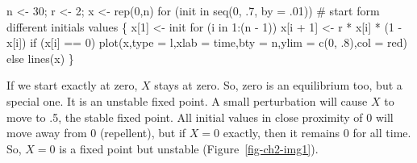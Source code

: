 \documentclass[
  a4paper,
  DIV=11,
  numbers=noendperiod,
  oneside]{scrreprt}
\newenvironment{Shaded}{\begin{snugshade}}{\end{snugshade}}
\newcommand{\AttributeTok}[1]{\textcolor[rgb]{0.40,0.45,0.13}{#1}}
\newcommand{\CommentTok}[1]{\textcolor[rgb]{0.37,0.37,0.37}{#1}}
\newcommand{\ControlFlowTok}[1]{\textcolor[rgb]{0.00,0.23,0.31}{#1}}
\newcommand{\DecValTok}[1]{\textcolor[rgb]{0.68,0.00,0.00}{#1}}
\newcommand{\FunctionTok}[1]{\textcolor[rgb]{0.28,0.35,0.67}{#1}}
\newcommand{\NormalTok}[1]{\textcolor[rgb]{0.00,0.23,0.31}{#1}}
\newcommand{\OtherTok}[1]{\textcolor[rgb]{0.00,0.23,0.31}{#1}}
\newcommand{\SpecialCharTok}[1]{\textcolor[rgb]{0.37,0.37,0.37}{#1}}
\newcommand{\StringTok}[1]{\textcolor[rgb]{0.13,0.47,0.30}{#1}}
\begin{document}
\begin{Shaded}
\begin{Highlighting}[]
\NormalTok{n }\OtherTok{\textless{}{-}} \DecValTok{30}\NormalTok{; r }\OtherTok{\textless{}{-}} \DecValTok{2}\NormalTok{; x }\OtherTok{\textless{}{-}} \FunctionTok{rep}\NormalTok{(}\DecValTok{0}\NormalTok{,n)}
\ControlFlowTok{for}\NormalTok{ (init }\ControlFlowTok{in} \FunctionTok{seq}\NormalTok{(}\DecValTok{0}\NormalTok{, .}\DecValTok{7}\NormalTok{, }\AttributeTok{by =}\NormalTok{ .}\DecValTok{01}\NormalTok{))}
  \CommentTok{\# start form different initials values}
\NormalTok{\{ }
\NormalTok{  x[}\DecValTok{1}\NormalTok{] }\OtherTok{\textless{}{-}}\NormalTok{ init}
  \ControlFlowTok{for}\NormalTok{ (i }\ControlFlowTok{in} \DecValTok{1}\SpecialCharTok{:}\NormalTok{(n }\SpecialCharTok{{-}} \DecValTok{1}\NormalTok{))}
\NormalTok{    x[i }\SpecialCharTok{+} \DecValTok{1}\NormalTok{] }\OtherTok{\textless{}{-}}\NormalTok{ r }\SpecialCharTok{*}\NormalTok{ x[i] }\SpecialCharTok{*}\NormalTok{ (}\DecValTok{1} \SpecialCharTok{{-}}\NormalTok{ x[i])}
  \ControlFlowTok{if}\NormalTok{ (x[i] }\SpecialCharTok{==} \DecValTok{0}\NormalTok{)}
    \FunctionTok{plot}\NormalTok{(x,}\AttributeTok{type =} \StringTok{\textquotesingle{}l\textquotesingle{}}\NormalTok{,}\AttributeTok{xlab =} \StringTok{\textquotesingle{}time\textquotesingle{}}\NormalTok{,}\AttributeTok{bty =} \StringTok{\textquotesingle{}n\textquotesingle{}}\NormalTok{,}\AttributeTok{ylim =} \FunctionTok{c}\NormalTok{(}\DecValTok{0}\NormalTok{, .}\DecValTok{8}\NormalTok{),}\AttributeTok{col =} \StringTok{\textquotesingle{}red\textquotesingle{}}\NormalTok{)}
  \ControlFlowTok{else}
    \FunctionTok{lines}\NormalTok{(x)}
\NormalTok{\}}
\end{Highlighting}
\end{Shaded}

If we start exactly at zero, \(X\) stays at zero. So, zero is an
equilibrium too, but a special one. It is an unstable fixed point. A
small perturbation will cause \(X\) to move to .5, the stable fixed
point. All initial values in close proximity of 0 will move away from 0
(repellent), but if \(X = 0\) exactly, then it remains 0 for all time.
So, \(X = 0\) is a fixed point but unstable (Figure~\ref{fig-ch2-img1}).
\end{document}
